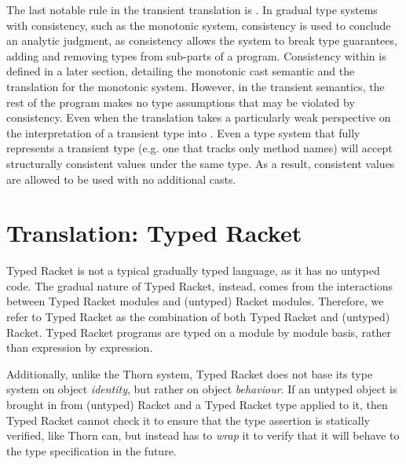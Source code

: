 \documentclass[a4paper,USenglish]{tex/lipics-v2016}
\begin{document}
\begin{mathpar}

\end{mathpar}

The last notable rule in the transient translation is . In gradual type systems with consistency, such as the monotonic system, 
consistency is used to conclude an analytic judgment, as consistency allows the system to break type guarantees, adding and removing types from sub-parts of a program.
Consistency within \kafka is defined in a later section, detailing the monotonic cast semantic and the translation for the monotonic system.   
However, in the transient semantics, the rest of the program makes no type assumptions that may be violated by consistency. Even when the 
translation takes a particularly weak perspective on the interpretation of a transient type into \kafka. Even a type system that
fully represents a transient type (e.g. one that tracks only method names) will accept structurally consistent values under the 
same type. As a result, consistent values are allowed to be used with no additional casts.

\section{Translation: Typed Racket}


Typed Racket is not a typical gradually typed language, as it has no untyped code.
The gradual nature of Typed Racket, instead, comes from the interactions between Typed Racket modules and 
(untyped) Racket modules. Therefore, we refer to Typed Racket as the combination of both 
Typed Racket and (untyped) Racket. Typed Racket programs are typed on a module by module basis, 
rather than expression by expression.

Additionally, unlike the Thorn system, Typed Racket does not base its type 
system on object \emph{identity}, but rather on object \emph{behaviour}. If an 
untyped object is brought in from (untyped) Racket and a Typed Racket type 
applied to it, then Typed Racket cannot check it to ensure that the type 
assertion is statically verified, like Thorn can, but instead has to \emph{wrap}
it to verify that it will behave to the type specification in the future.
\end{document}
